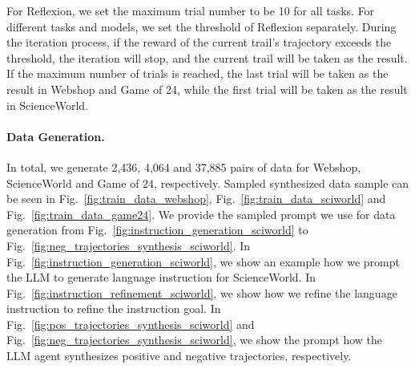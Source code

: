 For Reflexion, we set the maximum trial number to be 10 for all tasks. For different tasks and models, we set the threshold of Reflexion separately. During the iteration process, if the reward of the current trail's trajectory exceeds the threshold, the iteration will stop, and the current trail will be taken as the result. If the maximum number of trials is reached, the last trial will be taken as the result in Webshop and Game of 24, while the first trial will be taken as the result in ScienceWorld.
\paragraph{Data Generation.} In total, we generate 2,436, 4,064 and 37,885 pairs of data for Webshop, ScienceWorld and Game of 24, respectively. Sampled synthesized data sample can be seen in Fig.~\ref{fig:train_data_webshop}, Fig.~\ref{fig:train_data_sciworld} and Fig.~\ref{fig:train_data_game24}. We provide the sampled prompt we use for data generation from Fig.~\ref{fig:instruction_generation_sciworld} to Fig.~\ref{fig:neg_trajectories_synthesis_sciworld}. In Fig.~\ref{fig:instruction_generation_sciworld}, we show an example how we prompt the LLM to generate language instruction for ScienceWorld. In Fig.~\ref{fig:instruction_refinement_sciworld}, we show how we refine the language instruction to refine the instruction goal. In Fig.~\ref{fig:pos_trajectories_synthesis_sciworld} and Fig.~\ref{fig:neg_trajectories_synthesis_sciworld}, we show the prompt how the LLM agent synthesizes positive and negative trajectories, respectively. 

\newpage

